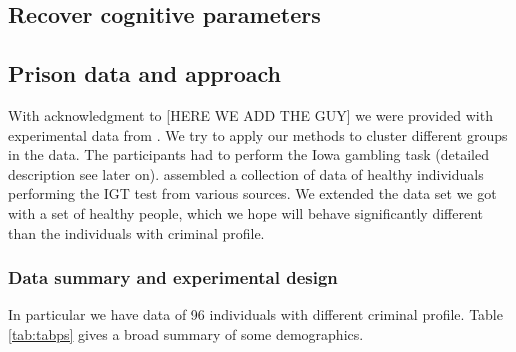 \documentclass[12pt,a4paper,bibliography=totocnumbered,listof=totocnumbered]{scrartcl}
\begin{document}
\subsection{Recover cognitive parameters}


\subsection{Prison data and approach}

With acknowledgment to [HERE WE ADD THE GUY] we were provided with experimental data from \cite{Yechiam2008}. We try to apply our methods to cluster different groups in the data. The participants had to perform the Iowa gambling task (detailed description see later on). \cite{Steingroever2015} assembled a collection of data of healthy individuals performing the IGT test from various sources. We extended the data set we got with a set of healthy people, which we hope will behave significantly different than the individuals with criminal profile.

\subsubsection{Data summary and experimental design}

In particular we have data of 96 individuals with different criminal profile. Table \ref{tab:tabps} gives a broad summary of some demographics. 
\end{document}
